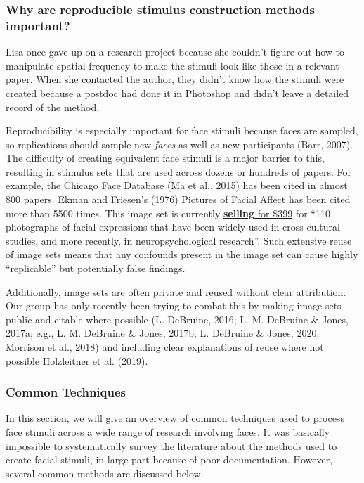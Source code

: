 \documentclass[
  doc,floatsintext]{apa6}
\begin{document}
\hypertarget{why-are-reproducible-stimulus-construction-methods-important}{%
\subsubsection{Why are reproducible stimulus construction methods important?}\label{why-are-reproducible-stimulus-construction-methods-important}}

Lisa once gave up on a research project because she couldn't figure out how to manipulate spatial frequency to make the stimuli look like those in a relevant paper. When she contacted the author, they didn't know how the stimuli were created because a postdoc had done it in Photoshop and didn't leave a detailed record of the method.

Reproducibility is especially important for face stimuli because faces are sampled, so replications should sample new \emph{faces} as well as new participants (Barr, 2007). The difficulty of creating equivalent face stimuli is a major barrier to this, resulting in stimulus sets that are used across dozens or hundreds of papers. For example, the Chicago Face Database (Ma et al., 2015) has been cited in almost 800 papers. Ekman and Friesen's (1976) Pictures of Facial Affect has been cited more than 5500 times. This image set is currently \href{https://www.paulekman.com/product/pictures-of-facial-affect-pofa/}{\textbf{selling} for \$399} for ``110 photographs of facial expressions that have been widely used in cross-cultural studies, and more recently, in neuropsychological research''. Such extensive reuse of image sets means that any confounds present in the image set can cause highly ``replicable'' but potentially false findings.

Additionally, image sets are often private and reused without clear attribution. Our group has only recently been trying to combat this by making image sets public and citable where possible (L. DeBruine, 2016; L. M. DeBruine \& Jones, 2017a; e.g., L. M. DeBruine \& Jones, 2017b; L. DeBruine \& Jones, 2020; Morrison et al., 2018) and including clear explanations of reuse where not possible Holzleitner et al. (2019).

\hypertarget{common-techniques}{%
\subsubsection{Common Techniques}\label{common-techniques}}

In this section, we will give an overview of common techniques used to process face stimuli across a wide range of research involving faces. It was basically impossible to systematically survey the literature about the methods used to create facial stimuli, in large part because of poor documentation. However, several common methods are discussed below.
\end{document}
